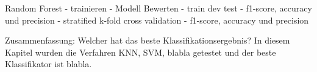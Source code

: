 Random Forest
- trainieren
- Modell Bewerten 
    - train dev test
    - f1-score, accuracy und precision
    - stratified k-fold cross validation
    - f1-score, accuracy und precision 


Zusammenfassung: Welcher hat das beste Klassifikationsergebnis?
In diesem Kapitel wurden die Verfahren KNN, SVM, blabla getestet und der beste Klassifikator ist blabla.
































